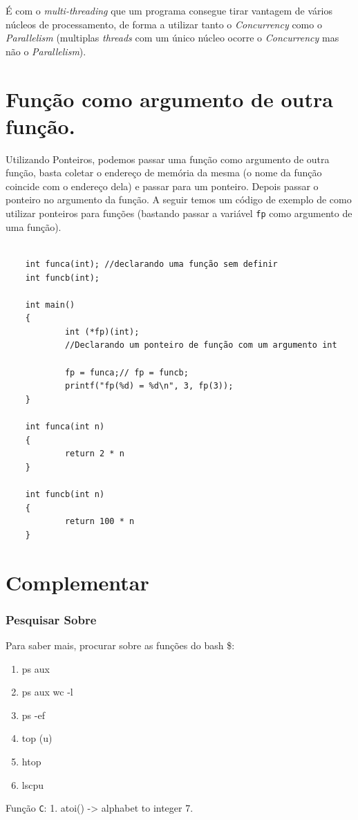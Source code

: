 É com o \emph{multi-threading} que um programa consegue tirar vantagem
de vários núcleos de processamento, de forma a utilizar tanto o
\emph{Concurrency} como o \emph{Parallelism} (multiplas \emph{threads}
com um único núcleo ocorre o \emph{Concurrency} mas não o
\emph{Parallelism}).

\hypertarget{funuxe7uxe3o-como-argumento-de-outra-funuxe7uxe3o.}{%
\section{Função como argumento de outra função.}\label{funuxe7uxe3o-como-argumento-de-outra-funuxe7uxe3o.}}

Utilizando Ponteiros, podemos passar uma função como argumento de outra
função, basta coletar o endereço de memória da mesma (o nome da função
coincide com o endereço dela) e passar para um ponteiro. Depois passar o
ponteiro no argumento da função. A seguir temos um código de exemplo de
como utilizar ponteiros para funções (bastando passar a variável
\texttt{fp} como argumento de uma função).



\begin{verbatim}

    int funca(int); //declarando uma função sem definir
    int funcb(int);
    
    int main()
    {
            int (*fp)(int); 
            //Declarando um ponteiro de função com um argumento int
            
            fp = funca;// fp = funcb;
            printf("fp(%d) = %d\n", 3, fp(3));
    }
    
    int funca(int n)
    {
            return 2 * n
    }
    
    int funcb(int n)
    {
            return 100 * n
    }
\end{verbatim}



\hypertarget{complementar}{%
\section{Complementar}\label{complementar}}

\hypertarget{pesquisar-sobre}{%
\subsubsection{Pesquisar Sobre}\label{pesquisar-sobre}}

Para saber mais, procurar sobre as funções do bash \$:

\begin{enumerate}
\def\labelenumi{\arabic{enumi}.}
\tightlist
\item
  ps aux
\item
  ps aux \textbar{} wc -l
\item
  ps -ef
\item
  top (u)
\item
  htop
\item
  lscpu
\end{enumerate}

Função \texttt{C}: 1. atoi() -\textgreater{} alphabet to integer 7.
